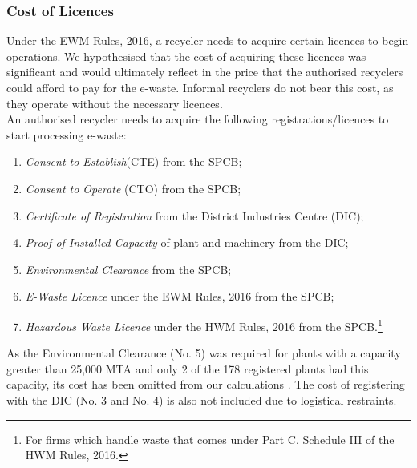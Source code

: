 \documentclass[a4paper, 12pt]{article}
\begin{document}
                    \subsubsection{Cost of Licences}
                    
                    Under the EWM Rules, 2016, a recycler needs to acquire certain licences to begin operations. We hypothesised that the cost of acquiring these licences was significant and would ultimately reflect in the price that the authorised recyclers could afford to pay for the e-waste. Informal recyclers do not bear this cost, as they operate without the necessary licences. \\
                    
                    An authorised recycler needs to acquire the following registrations/licences to start processing e-waste:                  
                    \begin{enumerate}
                      \item \textit{Consent to Establish}(CTE) from the SPCB;
                      \item \textit{Consent to Operate} (CTO) from the SPCB;
                      \item \textit{Certificate of Registration} from the District Industries Centre (DIC);
                      \item \textit{Proof of Installed Capacity} of plant and machinery from the DIC;
                      \item \textit{Environmental Clearance} from the SPCB; 
                      \item \textit{E-Waste Licence} under the EWM Rules, 2016 from the SPCB;
                      \item \textit{Hazardous Waste Licence} under the HWM Rules, 2016 from the SPCB.\footnote{For firms which handle waste that comes under Part C, Schedule III of the HWM Rules, 2016.} 
                    \end{enumerate}
                    
                    As the Environmental Clearance (No. 5) was required for plants with a capacity greater than 25,000 MTA and only 2 of the 178 registered plants had this capacity, its cost has been omitted from our calculations \parencite{cpcbrecyclersreport}. The cost of registering with the DIC (No. 3 and No. 4) is also not included due to logistical restraints.\\
                    
\end{document}
